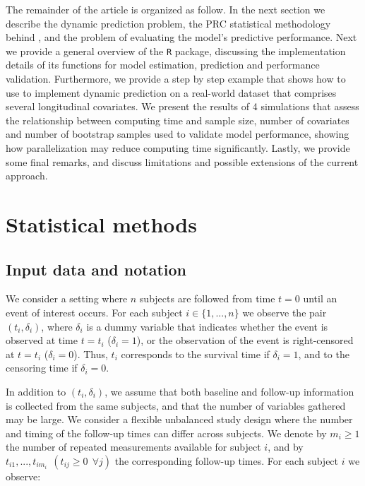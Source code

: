 The remainder of the article is organized as follow. In the next section
we describe the dynamic prediction problem, the PRC statistical
methodology \citep{signorelli2021} behind , and the
problem of evaluating the model's predictive performance. Next we
provide a general overview of the \texttt{R} package, discussing the
implementation details of its functions for model estimation, prediction
and performance validation. Furthermore, we provide a step by step
example that shows how to use  to implement dynamic
prediction on a real-world dataset that comprises several longitudinal
covariates. We present the results of 4 simulations that assess the
relationship between computing time and sample size, number of
covariates and number of bootstrap samples used to validate model
performance, showing how parallelization may reduce computing time
significantly. Lastly, we provide some final remarks, and discuss
limitations and possible extensions of the current approach.

\section{Statistical methods}\label{statistical-methods}

\subsection{Input data and notation}\label{input-data-and-notation}

We consider a setting where \(n\) subjects are followed from time
\(t = 0\) until an event of interest occurs. For each subject
\(i \in \{1, ..., n\}\) we observe the pair \((t_i, \delta_i)\), where
\(\delta_i\) is a dummy variable that indicates whether the event is
observed at time \(t = t_i\) (\(\delta_i = 1\)), or the observation of
the event is right-censored at \(t = t_i\) (\(\delta_i = 0\)). Thus,
\(t_i\) corresponds to the survival time if \(\delta_i = 1\), and to the
censoring time if \(\delta_i = 0\).

In addition to \((t_i, \delta_i)\), we assume that both baseline and
follow-up information is collected from the same subjects, and that the
number of variables gathered may be large. We consider a flexible
unbalanced study design where the number and timing of the follow-up
times can differ across subjects. We denote by \(m_i \geq 1\) the number
of repeated measurements available for subject \(i\), and by
\(t_{i1}, ..., t_{i m_i} \:\: (t_{ij} \geq 0 \:\: \forall j)\) the
corresponding follow-up times. For each subject \(i\) we observe:

